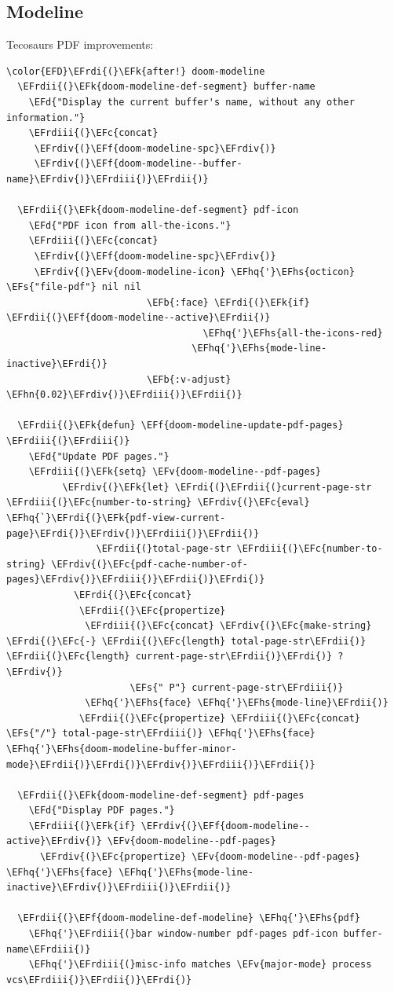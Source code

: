 \documentclass{scrartcl}
\newcommand{\EFk}[1]{\textcolor{EFk}{#1}} %
\newcommand{\EFd}[1]{\textcolor{EFd}{\textit{#1}}} %
\newcommand{\EFs}[1]{\textcolor{EFs}{#1}} %
\newcommand{\EFb}[1]{\textcolor{EFb}{#1}} %
\newcommand{\EFc}[1]{\textcolor{EFc}{#1}} %
\newcommand{\EFv}[1]{\textcolor{EFv}{#1}} %
\newcommand{\EFf}[1]{\textcolor{EFf}{#1}} %
\newcommand{\EFhn}[1]{\textcolor{EFhn}{\textbf{#1}}} %
\newcommand{\EFhq}[1]{\textcolor{EFhq}{#1}} %
\newcommand{\EFhs}[1]{\textcolor{EFhs}{#1}} %
\newcommand{\EFrdi}[1]{\textcolor{EFrdi}{#1}} %
\newcommand{\EFrdii}[1]{\textcolor{EFrdii}{#1}} %
\newcommand{\EFrdiii}[1]{\textcolor{EFrdiii}{#1}} %
\newcommand{\EFrdiv}[1]{\textcolor{EFrdiv}{#1}} %
\begin{document}
\subsection{Modeline}
\label{sec:org56ce955}
Tecosaurs PDF improvements:
\begin{Code}
\begin{Verbatim}[]
\color{EFD}\EFrdi{(}\EFk{after!} doom-modeline
  \EFrdii{(}\EFk{doom-modeline-def-segment} buffer-name
    \EFd{"Display the current buffer's name, without any other information."}
    \EFrdiii{(}\EFc{concat}
     \EFrdiv{(}\EFf{doom-modeline-spc}\EFrdiv{)}
     \EFrdiv{(}\EFf{doom-modeline--buffer-name}\EFrdiv{)}\EFrdiii{)}\EFrdii{)}

  \EFrdii{(}\EFk{doom-modeline-def-segment} pdf-icon
    \EFd{"PDF icon from all-the-icons."}
    \EFrdiii{(}\EFc{concat}
     \EFrdiv{(}\EFf{doom-modeline-spc}\EFrdiv{)}
     \EFrdiv{(}\EFv{doom-modeline-icon} \EFhq{'}\EFhs{octicon} \EFs{"file-pdf"} nil nil
                         \EFb{:face} \EFrdi{(}\EFk{if} \EFrdii{(}\EFf{doom-modeline--active}\EFrdii{)}
                                   \EFhq{'}\EFhs{all-the-icons-red}
                                 \EFhq{'}\EFhs{mode-line-inactive}\EFrdi{)}
                         \EFb{:v-adjust} \EFhn{0.02}\EFrdiv{)}\EFrdiii{)}\EFrdii{)}

  \EFrdii{(}\EFk{defun} \EFf{doom-modeline-update-pdf-pages} \EFrdiii{(}\EFrdiii{)}
    \EFd{"Update PDF pages."}
    \EFrdiii{(}\EFk{setq} \EFv{doom-modeline--pdf-pages}
          \EFrdiv{(}\EFk{let} \EFrdi{(}\EFrdii{(}current-page-str \EFrdiii{(}\EFc{number-to-string} \EFrdiv{(}\EFc{eval} \EFhq{`}\EFrdi{(}\EFk{pdf-view-current-page}\EFrdi{)}\EFrdiv{)}\EFrdiii{)}\EFrdii{)}
                \EFrdii{(}total-page-str \EFrdiii{(}\EFc{number-to-string} \EFrdiv{(}\EFc{pdf-cache-number-of-pages}\EFrdiv{)}\EFrdiii{)}\EFrdii{)}\EFrdi{)}
            \EFrdi{(}\EFc{concat}
             \EFrdii{(}\EFc{propertize}
              \EFrdiii{(}\EFc{concat} \EFrdiv{(}\EFc{make-string} \EFrdi{(}\EFc{-} \EFrdii{(}\EFc{length} total-page-str\EFrdii{)} \EFrdii{(}\EFc{length} current-page-str\EFrdii{)}\EFrdi{)} ? \EFrdiv{)}
                      \EFs{" P"} current-page-str\EFrdiii{)}
              \EFhq{'}\EFhs{face} \EFhq{'}\EFhs{mode-line}\EFrdii{)}
             \EFrdii{(}\EFc{propertize} \EFrdiii{(}\EFc{concat} \EFs{"/"} total-page-str\EFrdiii{)} \EFhq{'}\EFhs{face} \EFhq{'}\EFhs{doom-modeline-buffer-minor-mode}\EFrdii{)}\EFrdi{)}\EFrdiv{)}\EFrdiii{)}\EFrdii{)}

  \EFrdii{(}\EFk{doom-modeline-def-segment} pdf-pages
    \EFd{"Display PDF pages."}
    \EFrdiii{(}\EFk{if} \EFrdiv{(}\EFf{doom-modeline--active}\EFrdiv{)} \EFv{doom-modeline--pdf-pages}
      \EFrdiv{(}\EFc{propertize} \EFv{doom-modeline--pdf-pages} \EFhq{'}\EFhs{face} \EFhq{'}\EFhs{mode-line-inactive}\EFrdiv{)}\EFrdiii{)}\EFrdii{)}

  \EFrdii{(}\EFf{doom-modeline-def-modeline} \EFhq{'}\EFhs{pdf}
    \EFhq{'}\EFrdiii{(}bar window-number pdf-pages pdf-icon buffer-name\EFrdiii{)}
    \EFhq{'}\EFrdiii{(}misc-info matches \EFv{major-mode} process vcs\EFrdiii{)}\EFrdii{)}\EFrdi{)}
\end{Verbatim}
\end{Code}
\end{document}
